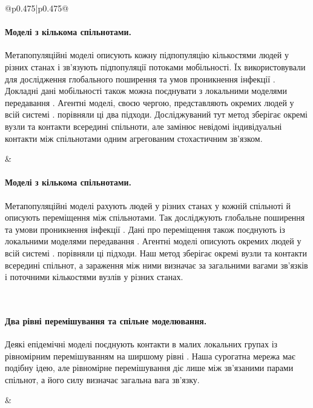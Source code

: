 \documentclass[11pt]{article}
\begin{document}
\begin{longtable}{@{}p{0.475\textwidth}|p{0.475\textwidth}@{}}
\begin{minipage}[t]{\linewidth}
\paragraph{Моделі з кількома спільнотами.}
Метапопуляційні моделі описують кожну підпопуляцію кількостями людей у різних станах і зв'язують підпопуляції потоками мобільності. Їх використовували для дослідження глобального поширення та умов проникнення інфекції \citep{colizza2007reaction,colizza2008,balcan2009,balcan2010modeling}. Докладні дані мобільності також можна поєднувати з локальними моделями передавання \citep{chang2021}. Агентні моделі, своєю чергою, представляють окремих людей у всій системі \citep{eubank2004,kerr2021}. \citet{ajelli2010} порівняли ці два підходи. Досліджуваний тут метод зберігає окремі вузли та контакти всередині спільноти, але замінює невідомі індивідуальні контакти між спільнотами одним агрегованим стохастичним зв'язком.
\end{minipage} &
\begin{minipage}[t]{\linewidth}
\paragraph{Моделі з кількома спільнотами.}
Метапопуляційні моделі рахують людей у різних станах у кожній спільноті й описують переміщення між спільнотами. Так досліджують глобальне поширення та умови проникнення інфекції \citep{colizza2007reaction,colizza2008,balcan2009,balcan2010modeling}. Дані про переміщення також поєднують із локальними моделями передавання \citep{chang2021}. Агентні моделі описують окремих людей у всій системі \citep{eubank2004,kerr2021}. \citet{ajelli2010} порівняли ці підходи. Наш метод зберігає окремі вузли та контакти всередині спільнот, а зараження між ними визначає за загальними вагами зв'язків і поточними кількостями вузлів у різних станах.
\end{minipage} \\[5mm]
\begin{minipage}[t]{\linewidth}
\paragraph{Два рівні перемішування та спільне моделювання.}
Деякі епідемічні моделі поєднують контакти в малих локальних групах із рівномірним перемішуванням на ширшому рівні \citep{ball1997}. Наша сурогатна мережа має подібну ідею, але рівномірне перемішування діє лише між зв'язаними парами спільнот, а його силу визначає загальна вага зв'язку.
\end{minipage} &
\begin{minipage}[t]{\linewidth}

\end{minipage}
\end{longtable}
\end{document}
